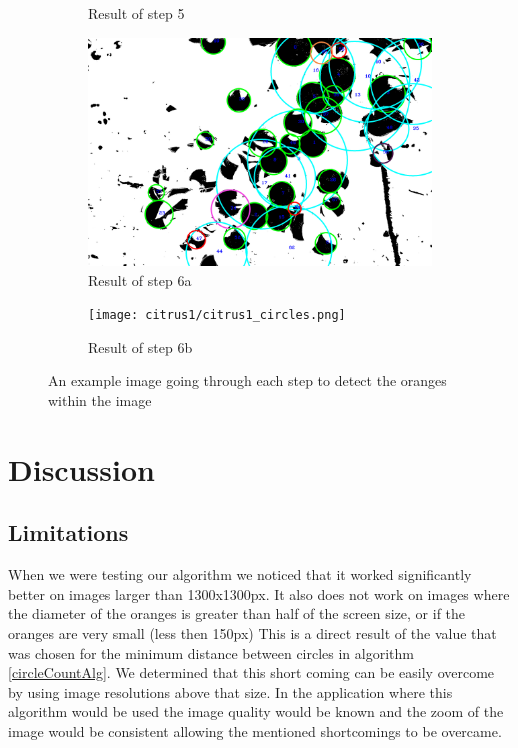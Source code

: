\documentclass[conference]{IEEEtran}
\begin{document}
\begin{figure}[H]
\begin{subfigure}{.3\linewidth}
  	\caption{Result of step 5}
  \end{subfigure}\par\medskip
  \begin{subfigure}{.49\linewidth}
  	\includegraphics[width=\linewidth]{citrus1/citrus1_circles_mask.png}\hfill
	   	\caption{Result of step 6a}
  \end{subfigure}
  \begin{subfigure}{.49\linewidth}
  	\texttt{[image: citrus1/citrus1\_circles.png]}\hfill
 	 \caption{Result of step 6b}
  \end{subfigure}
  \caption{An example image going through each step to detect the oranges within the image} \label{fig:stages}
\end{figure}


\section{Discussion}

\subsection{Limitations} \label{sec:limitations}

When we were testing our algorithm we noticed that it worked significantly better on images larger than 1300x1300px. It also does not work on images where the diameter of the oranges is greater than half of the screen size, or if the oranges are very small (less then 150px) This is a direct result of the value that was chosen for the minimum distance between circles in algorithm \ref{circleCountAlg}. We determined that this short coming can be easily overcome by using image resolutions above that size. In the application where this algorithm would be used the image quality would be known and the zoom of the image would be consistent allowing the mentioned shortcomings to be overcame. 
\end{document}
